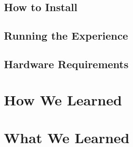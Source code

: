 \documentclass[10pt,journal,compsoc,onecolumn, draftclsnofoot]{IEEEtran}
\begin{document}
\subsection{How to Install}
\subsection{Running the Experience}
\subsection{Hardware Requirements}

\section{How We Learned}

\section{What We Learned}

% 
% 
\end{document}
